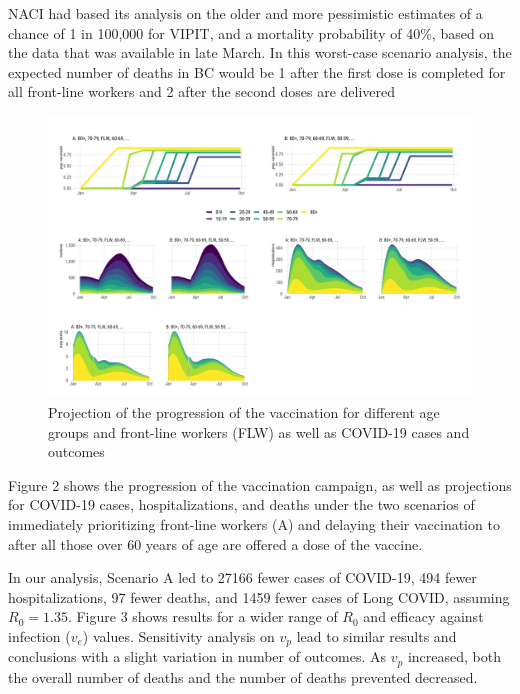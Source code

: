 \documentclass[]{interact}
\theoremstyle{plain}%
\theoremstyle{definition}
\theoremstyle{remark}
\begin{document}
NACI had based its analysis on the older and more pessimistic estimates
of a chance of 1 in 100,000 for VIPIT, and a mortality probability of
40\%, based on the data that was available in late March. In this
worst-case scenario analysis, the expected number of deaths in BC would
be 1 after the first dose is completed for all front-line workers and 2
after the second doses are delivered

\begin{figure}

{\centering \includegraphics[width=1\linewidth]{../figures/fig-trajectoriesFull} 

}

\caption{Projection of the progression of the vaccination for different age groups and front-line workers (FLW) as well as COVID-19 cases and outcomes}\label{fig:fig1}
\end{figure}

Figure 2 shows the progression of the vaccination campaign, as well as
projections for COVID-19 cases, hospitalizations, and deaths under the
two scenarios of immediately prioritizing front-line workers (A) and
delaying their vaccination to after all those over 60 years of age are
offered a dose of the vaccine.

In our analysis, Scenario A led to 27166 fewer cases of COVID-19, 494
fewer hospitalizations, 97 fewer deaths, and 1459 fewer cases of Long
COVID, assuming \(R_0=1.35\). Figure 3 shows results for a wider range
of \(R_0\) and efficacy against infection (\(v_e\)) values. Sensitivity
analysis on \(v_p\) lead to similar results and conclusions with a
slight variation in number of outcomes. As \(v_p\) increased, both the
overall number of deaths and the number of deaths prevented decreased.
\end{document}
